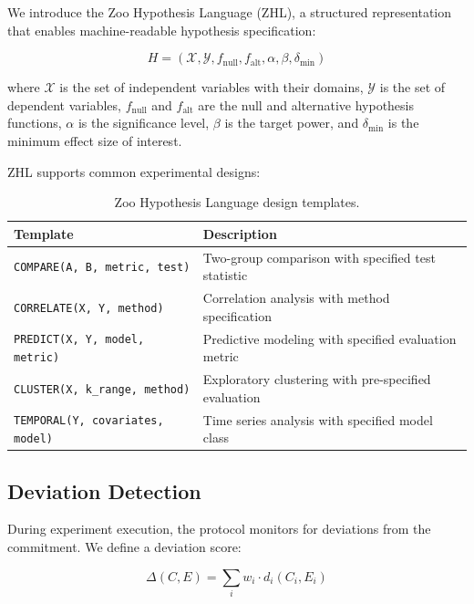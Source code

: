 We introduce the Zoo Hypothesis Language (ZHL), a structured representation that enables machine-readable hypothesis specification:

\begin{equation}
    H = (\mathcal{X}, \mathcal{Y}, f_{\text{null}}, f_{\text{alt}}, \alpha, \beta, \delta_{\min})
\end{equation}

\noindent where $\mathcal{X}$ is the set of independent variables with their domains, $\mathcal{Y}$ is the set of dependent variables, $f_{\text{null}}$ and $f_{\text{alt}}$ are the null and alternative hypothesis functions, $\alpha$ is the significance level, $\beta$ is the target power, and $\delta_{\min}$ is the minimum effect size of interest.

ZHL supports common experimental designs:

\begin{table}[H]
\centering
\caption{Zoo Hypothesis Language design templates.}
\label{tab:zhl_templates}
\begin{tabularx}{\textwidth}{@{}lX@{}}
\toprule
\textbf{Template} & \textbf{Description} \\
\midrule
\texttt{COMPARE(A, B, metric, test)} & Two-group comparison with specified test statistic \\
\texttt{CORRELATE(X, Y, method)} & Correlation analysis with method specification \\
\texttt{PREDICT(X, Y, model, metric)} & Predictive modeling with specified evaluation metric \\
\texttt{CLUSTER(X, k\_range, method)} & Exploratory clustering with pre-specified evaluation \\
\texttt{TEMPORAL(Y, covariates, model)} & Time series analysis with specified model class \\
\bottomrule
\end{tabularx}
\end{table}

\subsection{Deviation Detection}

During experiment execution, the protocol monitors for deviations from the commitment.
We define a deviation score:

\begin{equation}
    \Delta(C, E) = \sum_{i} w_i \cdot d_i(C_i, E_i)
\end{equation}


